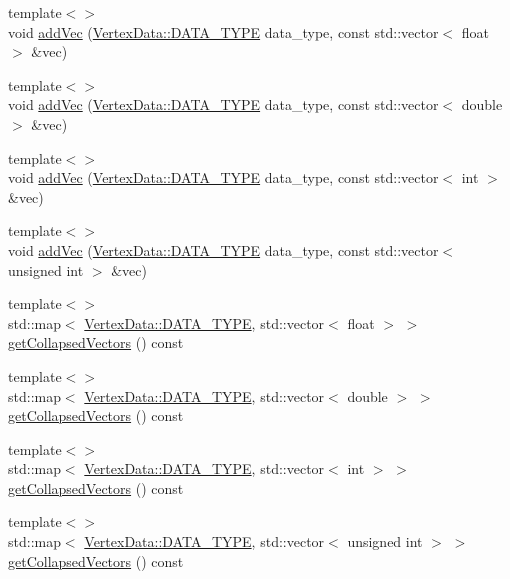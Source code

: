 \begin{DoxyCompactItemize}
\item 
{\footnotesize template$<$$>$ }\\void \hyperlink{class_graphics_1_1_vertex_data_a3c16815abdf03faa1789af508f378b4a}{add\+Vec} (\hyperlink{class_graphics_1_1_vertex_data_a50e88236939dc2a3ec4df7aeb728620e}{Vertex\+Data\+::\+D\+A\+T\+A\+\_\+\+T\+Y\+P\+E} data\+\_\+type, const std\+::vector$<$ float $>$ \&vec)
\item 
{\footnotesize template$<$$>$ }\\void \hyperlink{class_graphics_1_1_vertex_data_a718710cb36c77da3ce7202fbf78f9dcf}{add\+Vec} (\hyperlink{class_graphics_1_1_vertex_data_a50e88236939dc2a3ec4df7aeb728620e}{Vertex\+Data\+::\+D\+A\+T\+A\+\_\+\+T\+Y\+P\+E} data\+\_\+type, const std\+::vector$<$ double $>$ \&vec)
\item 
{\footnotesize template$<$$>$ }\\void \hyperlink{class_graphics_1_1_vertex_data_addc04a692143dbd59ef3eb1b9107afc9}{add\+Vec} (\hyperlink{class_graphics_1_1_vertex_data_a50e88236939dc2a3ec4df7aeb728620e}{Vertex\+Data\+::\+D\+A\+T\+A\+\_\+\+T\+Y\+P\+E} data\+\_\+type, const std\+::vector$<$ int $>$ \&vec)
\item 
{\footnotesize template$<$$>$ }\\void \hyperlink{class_graphics_1_1_vertex_data_ad5b58302a2e592db88a896f8e8cbd83d}{add\+Vec} (\hyperlink{class_graphics_1_1_vertex_data_a50e88236939dc2a3ec4df7aeb728620e}{Vertex\+Data\+::\+D\+A\+T\+A\+\_\+\+T\+Y\+P\+E} data\+\_\+type, const std\+::vector$<$ unsigned int $>$ \&vec)
\item 
{\footnotesize template$<$$>$ }\\std\+::map$<$ \hyperlink{class_graphics_1_1_vertex_data_a50e88236939dc2a3ec4df7aeb728620e}{Vertex\+Data\+::\+D\+A\+T\+A\+\_\+\+T\+Y\+P\+E}, std\+::vector$<$ float $>$ $>$ \hyperlink{class_graphics_1_1_vertex_data_a248ab37b8eec5e4befba68c09a56fc1b}{get\+Collapsed\+Vectors} () const 
\item 
{\footnotesize template$<$$>$ }\\std\+::map$<$ \hyperlink{class_graphics_1_1_vertex_data_a50e88236939dc2a3ec4df7aeb728620e}{Vertex\+Data\+::\+D\+A\+T\+A\+\_\+\+T\+Y\+P\+E}, std\+::vector$<$ double $>$ $>$ \hyperlink{class_graphics_1_1_vertex_data_a460ef7490af53909849ede22d63f3144}{get\+Collapsed\+Vectors} () const 
\item 
{\footnotesize template$<$$>$ }\\std\+::map$<$ \hyperlink{class_graphics_1_1_vertex_data_a50e88236939dc2a3ec4df7aeb728620e}{Vertex\+Data\+::\+D\+A\+T\+A\+\_\+\+T\+Y\+P\+E}, std\+::vector$<$ int $>$ $>$ \hyperlink{class_graphics_1_1_vertex_data_a198830ed9c9eaadd45776b17bfa2909d}{get\+Collapsed\+Vectors} () const 
\item 
{\footnotesize template$<$$>$ }\\std\+::map$<$ \hyperlink{class_graphics_1_1_vertex_data_a50e88236939dc2a3ec4df7aeb728620e}{Vertex\+Data\+::\+D\+A\+T\+A\+\_\+\+T\+Y\+P\+E}, std\+::vector$<$ unsigned int $>$ $>$ \hyperlink{class_graphics_1_1_vertex_data_a1a056a887e89425563b93c7d14402a21}{get\+Collapsed\+Vectors} () const 
\end{DoxyCompactItemize}
